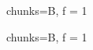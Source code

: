 \documentclass{article}
\begin{document}
\begin{InlineCode}{
  chunks=B,
}
f = 1
\end{InlineCode}
\begin{InlineCode}{
  chunks=B,
}
f = 1
\end{InlineCode}
\end{document}
